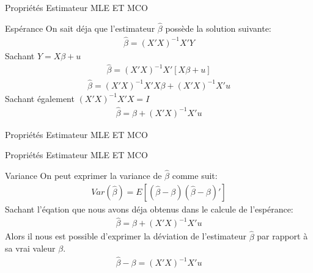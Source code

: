 \documentclass{beamer}
\begin{document}
\begin{frame}{Propriétés Estimateur MLE ET MCO}
\begin{block}{Espérance}
On sait déja que l'estimateur $\hat{\beta}$ possède la solution suivante:
\begin{align*}
\hat{\beta} = (X'X)^{-1}X'Y
\end{align*}
Sachant $Y= X\beta +u$
\begin{align*}
\hat{\beta} = (X'X)^{-1}X'[X\beta +u]
\end{align*}
\begin{align*}
\hat{\beta} = (X'X)^{-1}X'X\beta +(X'X)^{-1}X'u
\end{align*}
Sachant également $(X'X)^{-1}X'X = I$
\begin{align*}
\hat{\beta} = \beta +(X'X)^{-1}X'u
\end{align*}
\end{block}
\end{frame}

\begin{frame}{Propriétés Estimateur MLE ET MCO}
\end{frame}



\begin{frame}{Propriétés Estimateur MLE ET MCO}
\begin{block}{Variance}
On peut exprimer la variance de $\hat{\beta}$ comme suit:
\begin{align*}
Var(\hat{\beta})=E[(\hat{\beta}-\beta)(\hat{\beta}-\beta)']
\end{align*}
Sachant l'éqation que nous avons déja obtenus dans le calcule de l'espérance:
\begin{align*}
\hat{\beta}=\beta +(X'X)^{-1}X'u
\end{align*}
Alors il nous est possible d'exprimer la déviation de l'estimateur $\hat{\beta}$ par rapport à sa vrai valeur $\beta$.
\begin{align*}
\hat{\beta}-\beta = (X'X)^{-1}X'u
\end{align*}
\end{block}
\end{frame}
\end{document}
